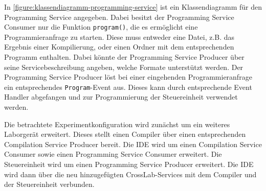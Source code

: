 In \autoref{figure:klassendiagramm-programming-service} ist ein Klassendiagramm für den Programming Service angegeben. Dabei besitzt der Programming Service Consumer nur die Funktion \texttt{program()}, die es ermöglicht eine Programmieranfrage zu starten. Diese muss entweder eine Datei, z.B. das Ergebnis einer Kompilierung, oder einen Ordner mit dem entsprechenden Programm enthalten. Dabei könnte der Programming Service Producer über seine Servicebeschreibung angeben, welche Formate unterstützt werden. Der Programming Service Producer löst bei einer eingehenden Programmieranfrage ein entsprechendes \texttt{Program}-Event aus. Dieses kann durch entsprechende Event Handler abgefangen und zur Programmierung der Steuereinheit verwendet werden.

Die betrachtete Experimentkonfiguration wird zunächst um ein weiteres Laborgerät erweitert. Dieses stellt einen Compiler über einen entsprechenden Compilation Service Producer bereit. Die IDE wird um einen Compilation Service Consumer sowie einen Programming Service Consumer erweitert. Die Steuereinheit wird um einen Programming Service Producer erweitert. Die IDE wird dann über die neu hinzugefügten CrossLab-Services mit dem Compiler und der Steuereinheit verbunden.